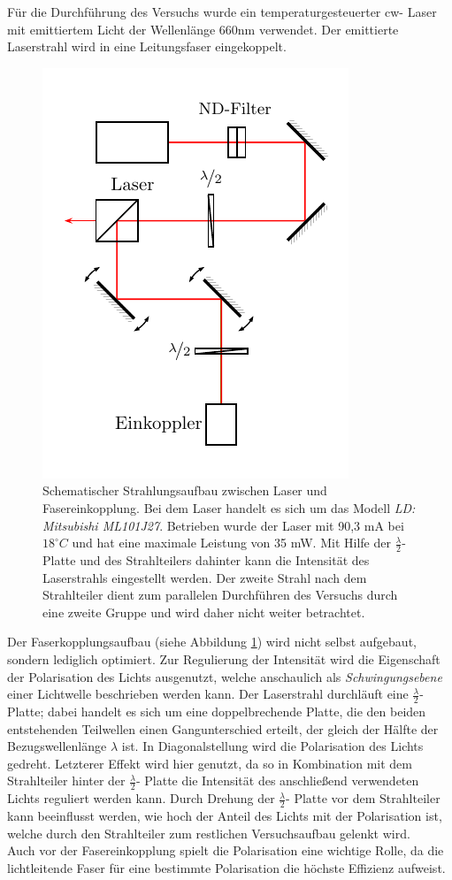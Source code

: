 
Für die Durchführung des Versuchs wurde ein temperaturgesteuerter cw- Laser mit emittiertem Licht der Wellenlänge 660nm verwendet. Der emittierte Laserstrahl wird in eine Leitungsfaser eingekoppelt.
\\
\begin{figure}[h]
\centering
\includegraphics[width=0.5\linewidth]{graphs/versuchsaufbau/lasereinheit}
\caption{Schematischer Strahlungsaufbau zwischen Laser und Fasereinkopplung. Bei dem Laser handelt es sich um das Modell  \textit{LD: Mitsubishi ML101J27}. Betrieben wurde der Laser mit 90,3 mA bei $18^\circ C$ und hat eine maximale Leistung von 35 mW. Mit Hilfe der $\frac{\lambda}{2}$- Platte und des Strahlteilers dahinter kann die Intensität des Laserstrahls eingestellt werden. Der zweite Strahl nach dem Strahlteiler dient zum parallelen Durchführen des Versuchs durch eine zweite Gruppe und wird daher nicht weiter betrachtet.}
\label{fig:lasereinheit}
\end{figure}

Der Faserkopplungsaufbau (siehe Abbildung \ref{fig:lasereinheit}) wird nicht selbst aufgebaut, sondern lediglich optimiert. Zur Regulierung der Intensität wird die Eigenschaft der Polarisation des Lichts ausgenutzt, welche anschaulich als \textit{Schwingungsebene} einer Lichtwelle beschrieben werden kann. Der Laserstrahl durchläuft eine $\frac{\lambda}{2}$- Platte; dabei handelt es sich um eine doppelbrechende Platte, die den beiden entstehenden Teilwellen einen Gangunterschied erteilt, der gleich der Hälfte der Bezugswellenlänge $\lambda$ ist. In Diagonalstellung wird die Polarisation des Lichts gedreht. Letzterer Effekt wird hier genutzt, da so in Kombination mit dem Strahlteiler hinter der  $\frac{\lambda}{2}$- Platte die Intensität des anschließend verwendeten Lichts reguliert werden kann. Durch Drehung der  $\frac{\lambda}{2}$- Platte vor dem Strahlteiler kann beeinflusst werden, wie hoch der Anteil des Lichts mit der Polarisation ist, welche durch den Strahlteiler zum restlichen Versuchsaufbau gelenkt wird.   \\
Auch vor der Fasereinkopplung spielt die Polarisation eine wichtige Rolle, da die lichtleitende Faser für eine bestimmte Polarisation die höchste Effizienz aufweist. \\

